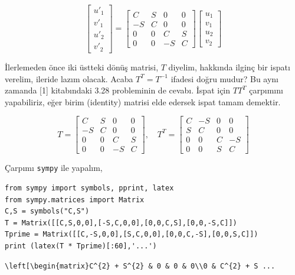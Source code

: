 \documentclass[12pt,fleqn]{article}\usepackage{../../common}
\begin{document}
$$
\left[\begin{array}{c}
u'_1 \\ v'_1 \\ u'_2 \\ v'_2
\end{array}\right] =
\left[\begin{array}{cccc}
C & S & 0 & 0 \\
-S & C & 0 & 0 \\
0 & 0 & C & S \\
0 & 0 & -S & C 
\end{array}\right]
\left[\begin{array}{c}
u_1 \\ v_1 \\ u_2 \\ v_2
\end{array}\right]
$$

İlerlemeden önce iki üstteki dönüş matrisi, $T$ diyelim, hakkında ilginç bir
ispatı verelim, ileride lazım olacak. Acaba $T^T = T^{-1}$ ifadesi doğru mudur?
Bu aynı zamanda [1] kitabındaki 3.28 probleminin de cevabı. İspat için $T T^T$
çarpımını yapabiliriz, eğer birim (identity) matrisi elde edersek ispat tamam
demektir.

$$
T = 
\left[\begin{array}{cccc}
C & S & 0 & 0 \\
-S & C & 0 & 0 \\
0 & 0 & C & S \\
0 & 0 & -S & C 
\end{array}\right], \quad
T^T = 
\left[\begin{array}{cccc}
C & -S & 0 & 0 \\
S & C & 0 & 0 \\
0 & 0 & C & -S \\
0 & 0 & S & C 
\end{array}\right]
$$

Çarpımı \verb!sympy! ile yapalım,

\begin{verbatim}
from sympy import symbols, pprint, latex
from sympy.matrices import Matrix
C,S = symbols("C,S")
T = Matrix([[C,S,0,0],[-S,C,0,0],[0,0,C,S],[0,0,-S,C]])
Tprime = Matrix([[C,-S,0,0],[S,C,0,0],[0,0,C,-S],[0,0,S,C]])
print (latex(T * Tprime)[:60],'...')
\end{verbatim}

\begin{verbatim}
\left[\begin{matrix}C^{2} + S^{2} & 0 & 0 & 0\\0 & C^{2} + S ...
\end{verbatim}
\end{document}
